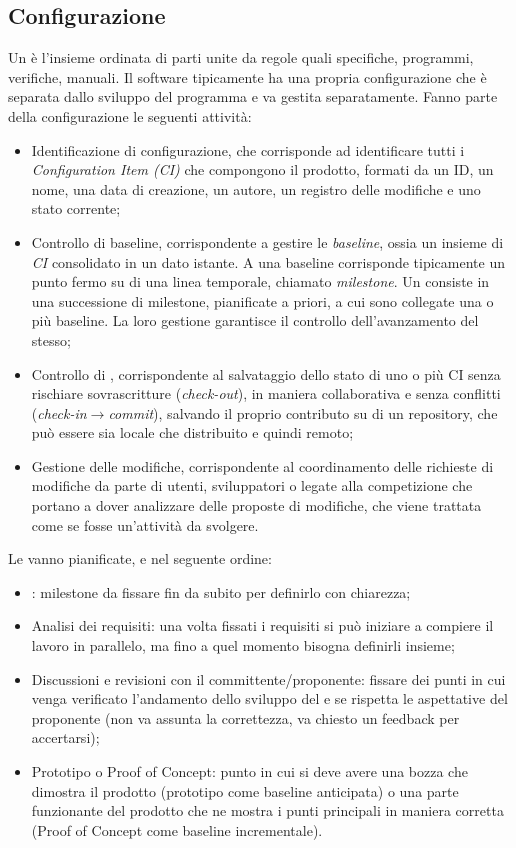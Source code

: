\documentclass[../main]{subfiles}
\begin{document}
\subsection{Configurazione}
Un  è l'insieme ordinata di parti unite da regole quali specifiche, programmi, verifiche, manuali. Il software tipicamente ha una propria configurazione che è separata dallo sviluppo del programma e va gestita separatamente.
Fanno parte della configurazione le seguenti attività:
\begin{itemize}
    \item Identificazione di configurazione, che corrisponde ad identificare tutti i \textit{Configuration Item (CI)} che compongono il prodotto, formati da un ID, un nome, una data di creazione, un autore, un registro delle modifiche e uno stato corrente;
    \item Controllo di baseline, corrispondente a gestire le \textit{baseline}, ossia un insieme di \textit{CI} consolidato in un dato istante. A una baseline corrisponde tipicamente un punto fermo su di una linea temporale, chiamato \textit{milestone}. Un  consiste in una successione di milestone, pianificate a priori, a cui sono collegate una o più baseline. La loro gestione garantisce il controllo dell'avanzamento del  stesso;
    \item Controllo di , corrispondente al salvataggio dello stato di uno o più CI senza rischiare sovrascritture (\textit{check-out}), in maniera collaborativa e senza conflitti (\textit{check-in$\rightarrow$commit}), salvando il proprio contributo su di un repository, che può essere sia locale che distribuito e quindi remoto;
    \item Gestione delle modifiche, corrispondente al coordinamento delle richieste di modifiche da parte di utenti, sviluppatori o legate alla competizione che portano a dover analizzare delle proposte di modifiche, che viene trattata come se fosse un'attività da svolgere.
\end{itemize}
Le  vanno pianificate, e nel seguente ordine:
\begin{itemize}
    \item {}: milestone da fissare fin da subito per definirlo con chiarezza;
    \item Analisi dei requisiti: una volta fissati i requisiti si può iniziare a compiere il lavoro in parallelo, ma fino a quel momento bisogna definirli insieme;
    \item Discussioni e revisioni con il committente/proponente: fissare dei punti in cui venga verificato l'andamento dello sviluppo del  e se rispetta le aspettative del proponente (non va assunta la correttezza, va chiesto un feedback per accertarsi);
    \item Prototipo o Proof of Concept: punto in cui si deve avere una bozza che dimostra il prodotto (prototipo come baseline anticipata) o una parte funzionante del prodotto che ne mostra i punti principali in maniera corretta (Proof of Concept come baseline incrementale).
\end{itemize}
\end{document}
